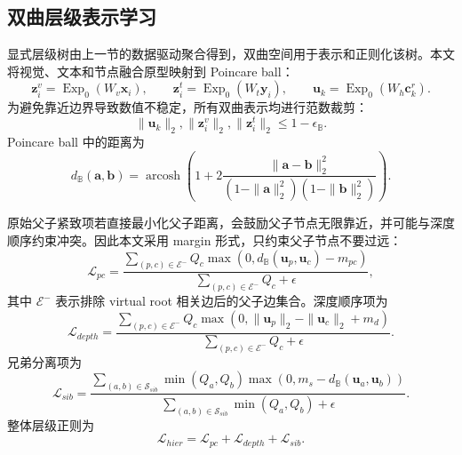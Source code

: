 \subsection{双曲层级表示学习}

显式层级树由上一节的数据驱动聚合得到，双曲空间用于表示和正则化该树。本文将视觉、文本和节点融合原型映射到 Poincare ball：
\begin{equation}
    \boldsymbol{z}_i^v=\operatorname{Exp}_{0}(W_v\boldsymbol{x}_i),\qquad
    \boldsymbol{z}_i^t=\operatorname{Exp}_{0}(W_t\boldsymbol{y}_i),\qquad
    \boldsymbol{u}_k=\operatorname{Exp}_{0}(W_h\boldsymbol{c}_k^r).
\end{equation}
为避免靠近边界导致数值不稳定，所有双曲表示均进行范数裁剪：
\begin{equation}
    \|\boldsymbol{u}_k\|_2,\|\boldsymbol{z}_i^v\|_2,\|\boldsymbol{z}_i^t\|_2 \leq 1-\epsilon_{\mathbb{B}}.
\end{equation}
Poincare ball 中的距离为
\begin{equation}
    d_{\mathbb{B}}(\boldsymbol{a},\boldsymbol{b})
    =
    \operatorname{arcosh}
    \left(
    1+
    2\frac{\|\boldsymbol{a}-\boldsymbol{b}\|_2^2}
    {(1-\|\boldsymbol{a}\|_2^2)(1-\|\boldsymbol{b}\|_2^2)}
    \right).
\end{equation}

原始父子紧致项若直接最小化父子距离，会鼓励父子节点无限靠近，并可能与深度顺序约束冲突。因此本文采用 margin 形式，只约束父子节点不要过远：
\begin{equation}
    \mathcal{L}_{pc}
    =
    \frac{
    \sum_{(p,c)\in\mathcal{E}^{-}}
    Q_c
    \max(0,d_{\mathbb{B}}(\boldsymbol{u}_p,\boldsymbol{u}_c)-m_{pc})
    }
    {
    \sum_{(p,c)\in\mathcal{E}^{-}}Q_c+\epsilon
    },
\end{equation}
其中 $\mathcal{E}^{-}$ 表示排除 virtual root 相关边后的父子边集合。深度顺序项为
\begin{equation}
    \mathcal{L}_{depth}
    =
    \frac{
    \sum_{(p,c)\in\mathcal{E}^{-}}
    Q_c
    \max(0,\|\boldsymbol{u}_p\|_2-\|\boldsymbol{u}_c\|_2+m_d)
    }
    {
    \sum_{(p,c)\in\mathcal{E}^{-}}Q_c+\epsilon
    }.
\end{equation}
兄弟分离项为
\begin{equation}
    \mathcal{L}_{sib}
    =
    \frac{
    \sum_{(a,b)\in\mathcal{S}_{sib}}
    \min(Q_a,Q_b)
    \max(0,m_s-d_{\mathbb{B}}(\boldsymbol{u}_a,\boldsymbol{u}_b))
    }
    {
    \sum_{(a,b)\in\mathcal{S}_{sib}}\min(Q_a,Q_b)+\epsilon
    }.
\end{equation}
整体层级正则为
\begin{equation}
    \mathcal{L}_{hier}
    =
    \mathcal{L}_{pc}
    +
    \mathcal{L}_{depth}
    +
    \mathcal{L}_{sib}.
\end{equation}

